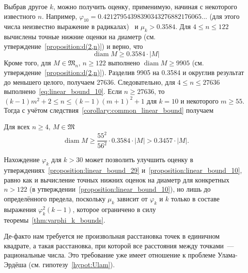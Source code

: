 Выбрав другое $k$, можно получить оценку, применимую, начиная с некоторого известного $n$.
Например, $\varphi_{10} = 0.42127954398390343276882176065...$
(для этого числа неизвестно выражение в радикалах)~\cite{degroot1990optimal10points} и
$\mu_k > 0.3584$.
Для $4 \leq n \leq 122$ вычислены точные нижние оценки на диаметр (см. утверждение~\ref{proposition:d(2,n)}) и верно, что
\begin{equation}
	\label{eq:linear_bound_10}
	\operatorname{diam} M \geq 0.3584 \cdot |M|
\end{equation}
Кроме того, для $M \in \mathfrak{M}_n$, $n \geq 122$ выполнено
$\operatorname{diam} M \geq 9905$ (см. утверждение~\ref{proposition:d(2,n)}).
Разделив 9905 на 0.3584  и округлив результат до меньшего целого, получаем 27636.
Следовательно, для $4 \leq n \leq 27636$ выполнено~\eqref{eq:linear_bound_10}.
Если $n \geq 27636$, то $ (k-1)m^2 + 2 \leq n \leq (k-1)(m+1)^2 + 1$ для $k=10$ и некоторого $m \geq 55$.
Тогда с учётом следствия~\ref{corollary:common_linear_bound} получаем
\begin{proposition}
	\label{proposition:linear_bound_10}
	Для всех $n \geq 4$, $M\in\mathfrak{M}$
	\begin{equation*}
		\operatorname{diam} M \geq \frac{55^2}{56^2} \cdot 0.3584 \cdot |M|
		>
		0.3457 \cdot |M|
		.
	\end{equation*}
\end{proposition}

\begin{remark}
	Нахождение $\varphi_k$ для $k > 30$ может позволить улучшить оценку
	в утверждениях~\ref{proposition:linear_bound_29} и~\ref{proposition:linear_bound_10},
	равно как и вычисление точных нижних оценок на диаметр для конкретных $n>122$ (в утверждении~\ref{proposition:linear_bound_10}),
	но лишь до определённого предела, поскольку $\mu_k$ зависит от $\varphi_k$ и $k$
	только в составе выражения $\varphi_k^2 (k-1)$,
	которое ограничено в силу теоремы~\ref{thm:varphi_k_bounds}.
\end{remark}

\begin{remark}
	Де-факто нам требуется не произвольная расстановка точек в единичном квадрате,
	а такая расстановка, при которой все расстояния между точками~--- рациональные числа.
	Это требование уже имеет отношение к проблеме Улама-Эрдёша (см. гипотезу~\ref{hypot:Ulam}).
\end{remark}
